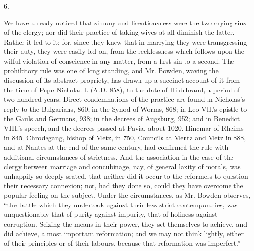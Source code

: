 6.

We have already noticed that simony and
licentiousness were the two crying sins of the clergy; nor did their
practice of taking wives at all diminish the latter. Rather it led to
it; for, since they knew that in marrying they were transgressing
their duty, they were easily led on, from the recklessness which
follows upon the wilful violation of conscience in any matter, from a
first sin to a second. The prohibitory rule was one of long standing,
and Mr. Bowden, waving the discussion of its abstract propriety, has
drawn up a succinct account of it from the time of Pope Nicholas I. (A.D.
858), to the date of Hildebrand, a period of two hundred years. Direct
condemnations of the practice are found in Nicholas's reply to the
Bulgarians, 860; in the Synod of Worms, 868; in Leo VII.'s epistle to
the Gauls and Germans, 938; in the decrees of Augsburg, 952; and in
Benedict VIII.'s speech, and the decrees passed at Pavia, about 1020.
Hincmar of Rheims in 845, Chrodegang, bishop of Metz, in 750, Councils
at Mentz and Metz in 888, and at Nantes at the end of the same
century, had confirmed the rule with additional circumstances of
strictness. And the association in the case of the clergy between
marriage and concubinage, nay, of general laxity of morals, was
unhappily so deeply seated, that neither did it occur to the reformers
to question their necessary connexion; nor, had they done so, could
they have overcome the popular feeling on the subject. Under the
circumstances, as Mr. Bowden observes, ``the battle which they
undertook against their less strict contemporaries, was unquestionably
that of purity against impurity, that of holiness against corruption.
Seizing the means in their power, they set themselves to achieve, and
did achieve, a most important reformation; and we may not think
lightly, either of their principles or of their labours, because
that reformation was imperfect.''

